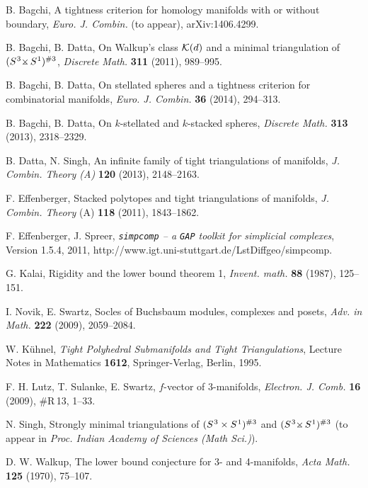 \documentclass[11pt]{article}
\begin{document}
{\small

\begin{thebibliography}{99}

B. Bagchi, 
A tightness criterion for homology manifolds with or without boundary,  {\em Euro. J. Combin.} (to appear), arXiv:1406.4299.

B. Bagchi, B. Datta, On Walkup's class ${\cal K}(d)$ and a minimal triangulation of $(S^{\hspace{.2mm}3} 
\mbox{$\times \hspace{-2.5mm}_{-}$} \, S^{\hspace{.1mm}1})^{\#3}$, {\em Discrete Math.} {\bf 311} (2011), 989--995.


B. Bagchi, B. Datta, On stellated spheres and a tightness
criterion for combinatorial manifolds, {\em Euro. J. Combin.} {\bf 36}
(2014), 294--313.

B. Bagchi, B. Datta, On $k$-stellated and $k$-stacked spheres, {\em Discrete
Math.} {\bf 313} (2013), 2318--2329.

B. Datta, N. Singh, An infinite family of tight triangulations of manifolds,
{\em J. Combin. Theory (A)} {\bf 120} (2013), 2148--2163.

 F. Effenberger, Stacked polytopes and tight
triangulations of manifolds, {\em J. Combin. Theory} (A) {\bf 118}
(2011), 1843--1862.

 F. Effenberger, J. Spreer, \emph{{\tt simpcomp}
-- a {\tt GAP} toolkit for simplicial complexes}, Version 1.5.4,
2011, http://www.igt.uni-stuttgart.de/LstDiffgeo/simpcomp.


 G. Kalai, Rigidity and the lower bound theorem 1, {\em
Invent.  math.} {\bf 88} (1987), 125--151.

 I. Novik, E. Swartz, Socles of Buchsbaum modules, complexes and
posets, {\em Adv. in Math.} {\bf 222} (2009), 2059--2084.

 W. K\"{u}hnel, {\em Tight Polyhedral Submanifolds and
Tight Triangulations}, Lecture Notes in Mathematics {\bf 1612},
Springer-Verlag, Berlin, 1995.

 F. H. Lutz, T. Sulanke, E. Swartz, $f$-vector of
3-manifolds, {\em Electron. J. Comb.} {\bf 16} (2009), \#R\,13,
1--33.

 N. Singh, Strongly minimal triangulations of
$(S^{\hspace{.2mm}3} \times S^{\hspace{.2mm}1})^{\#3}$ and
$(S^{\hspace{.2mm}3} \mbox{$\times \hspace{-2.5mm}_{-}$} \,
S^{\hspace{.1mm}1})^{\#3}$ (to appear in {\em Proc. Indian Academy of Sciences
(Math Sci.)}).

 D. W. Walkup, The lower bound conjecture for 3- and
4-manifolds, {\em Acta Math.} {\bf 125} (1970), 75--107.

\end{thebibliography} }
\end{document}
